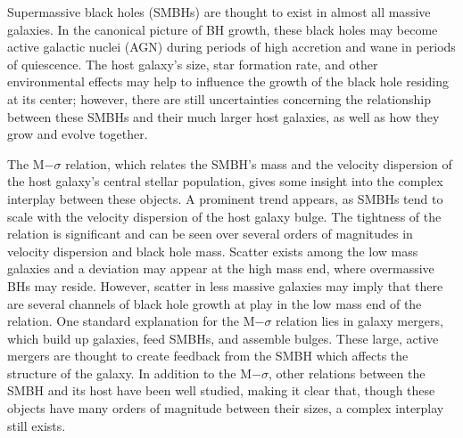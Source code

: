 \documentclass[manuscript]{aastex}
\begin{document}

Supermassive black holes (SMBHs) are thought to exist in almost all massive galaxies. \citep{Kormendy2013} In the canonical picture of BH growth, these black holes may become active galactic nuclei (AGN) during periods of high accretion and wane in periods of quiescence. \citep{Volonteri2012,Alexander2005,Papovich2006} The host galaxy's size, star formation rate, and other environmental effects may help to influence the growth of the black hole residing at its center; however, there are still uncertainties concerning the relationship between these SMBHs and their much larger host galaxies, as well as how they grow and evolve together. \citep[5-8 citations here]{Haehnelt2000,DiMatteo2005,Fu2008,Hopkins2006,Sijacki2009,Silverman2009,Mullaney2012}

The M$-\sigma$ relation, which relates the SMBH's mass and the velocity dispersion of the host galaxy's central stellar population, gives some insight into the complex interplay between these objects. \citep{Ferrarese2000} A prominent trend appears, as SMBHs tend to scale with the velocity dispersion of the host galaxy bulge. %
The tightness of the relation is significant and can be seen over several orders of magnitudes in velocity dispersion and black hole mass. \citep{Mcconnell2013,Kormendy2013,Merritt2001,Graham2011} Scatter exists among the low mass galaxies and a deviation may appear at the high mass end, where overmassive BHs may reside. \citep{Moster2010,Natarajan2011,VanDenBosch2007} However, scatter in less massive galaxies may imply that there are several channels of black hole growth at play in the low mass end of the relation. \citep{Micic2007,Volonteri2009,Reines2013,Graham2014} One standard explanation for the M$-\sigma$ relation lies in galaxy mergers, which build up galaxies, feed SMBHs, and assemble bulges. \citep{DiMatteo2005,} These large, active mergers are thought to create feedback from the SMBH which affects the structure of the galaxy. In addition to the M$-\sigma$, other relations between the SMBH and its host have been well studied, making it clear that, though these objects have many orders of magnitude between their sizes, a complex interplay still exists.
\end{document}
